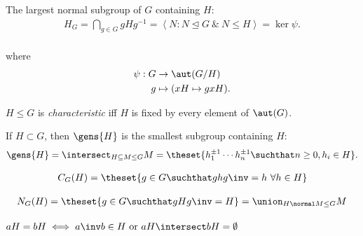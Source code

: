 \begin{definition}

The largest normal subgroup of \(G\) containing \(H\): \begin{align*}
H_G = \bigcap_{g\in G} gHg^{-1} = \left\langle  N: N \unlhd G ~\&~ N \leq H\right\rangle = \ker \psi
.\end{align*}\\
where \begin{align*}
\psi: G &\to \aut(G/H) \\
g &\mapsto (xH\mapsto gxH)
.\end{align*}

\end{definition}

\begin{definition}

\(H\leq G\) is \emph{characteristic} iff \(H\) is fixed by every element
of \(\aut(G)\).

\end{definition}

\begin{definition}

If \(H\subset G\), then \(\gens{H}\) is the smallest subgroup containing
\(H\): \begin{align*}
\gens{H} = \intersect_{H\subseteq M \leq G} M = \theset{ h_1^{\pm 1} \cdots h_n^{\pm 1} \suchthat n\geq 0, h_i \in H}
.\end{align*}

\end{definition}

\begin{definition}[Centralizer]

\begin{align*}
C_G(H) = \theset{g\in G \suchthat ghg\inv = h ~\forall h\in H}
\end{align*}

\end{definition}

\begin{definition}[Normalizer]

\begin{align*}
N_G(H) = \theset{g\in G \suchthat gHg\inv = H} = \union_{H\normal M \leq G} M
\end{align*}

\end{definition}

\begin{theorem}

\(aH = bH \iff a\inv b \in H \text{ or } aH \intersect bH = \emptyset\)

\end{theorem}

